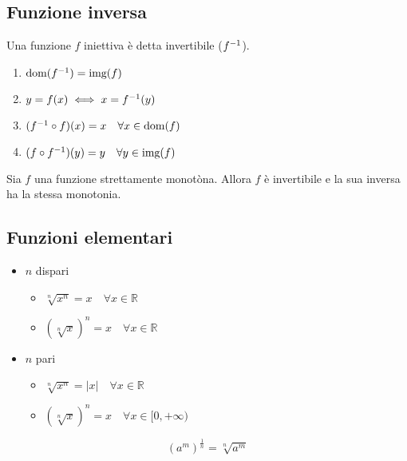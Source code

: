 \documentclass[12pt, a4paper]{report}
\begin{document}
    \subsection{Funzione inversa}
    Una funzione $f$ iniettiva è detta invertibile ($f^{-1}$).
    \begin{enumerate}
        \item $\text{dom}(f^{-1})=\text{img}(f)$
        \item $y=f(x) \iff x = f^{-1}(y)$
        \item $(f^{-1}\circ f)(x)=x \quad \forall x \in \text{dom}(f)$
        \item $(f\circ f^{-1})(y)=y \quad \forall y \in \text{img}(f)$
    \end{enumerate}
    Sia $f$ una funzione strettamente monotòna. Allora $f$ è invertibile e la sua inversa ha la stessa monotonia.
    \subsection{Funzioni elementari}
    \begin{itemize}
        \item $n$ dispari \begin{itemize}
            \item $\sqrt[n]{x^{n}}=x \quad \forall x \in \mathbb{R}$
            \item $(\sqrt[n]{x})^{n}=x \quad \forall x \in \mathbb{R}$
        \end{itemize}
        \item $n$ pari \begin{itemize}
            \item $\sqrt[n]{x^{n}}=|x|  \quad \forall x \in \mathbb{R}$
            \item $(\sqrt[n]{x})^{n}=x \quad \forall x \in [0,+\infty)$ 
        \end{itemize}
    \end{itemize}
    \begin{equation*}
        (a^{m})^{\frac{1}{n}}=\sqrt[n]{a^{m}}
    \end{equation*}
\end{document}
